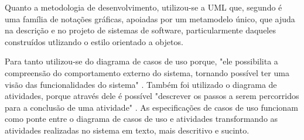 Quanto a metodologia de desenvolvimento, utilizou-se a UML que, segundo  é uma família de notações gráficas, apoiadas por um metamodelo único, que ajuda na descrição e no projeto de sistemas de software, particularmente daqueles construídos utlizando o estilo orientado a objetos.

Para tanto utilizou-se do diagrama de casos de uso porque, "ele possibilita a compreensão do comportamento externo do sistema, tornando possível ter uma visão das funcionalidades do sistema" \cite{guedes18}. Também foi utilizado o diagrama de atividades, porque através dele é possível "descrever os passos a serem percorridos para a conclusão de uma atividade"  \cite{guedes18}. As especificações de casos de uso funcionam como ponte entre o diagrama de casos de uso e atividades transformando as atividades realizadas no sistema em texto, mais descritivo e sucinto.
